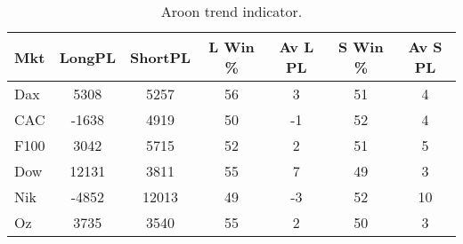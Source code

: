 \begin{table}[ht]
\centering
\caption[Aroon trend indicator]{Aroon trend indicator.} 
\label{tab:aroon_results}
\begin{tabular}{lcccccc}
  \toprule Mkt & LongPL & ShortPL & L Win \% & Av L PL & S Win \% & Av S PL \\ 
  \midrule Dax & 5308 & 5257 & 56 & 3 & 51 & 4 \\ 
  CAC & -1638 & 4919 & 50 & -1 & 52 & 4 \\ 
  F100 & 3042 & 5715 & 52 & 2 & 51 & 5 \\ 
  Dow & 12131 & 3811 & 55 & 7 & 49 & 3 \\ 
  Nik & -4852 & 12013 & 49 & -3 & 52 & 10 \\ 
  Oz & 3735 & 3540 & 55 & 2 & 50 & 3 \\ 
   \bottomrule \end{tabular}
\end{table}
